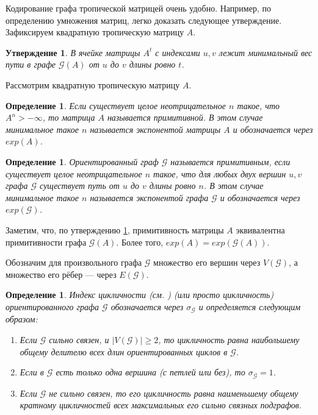 \documentclass[12pt]{article}
\newtheorem{definition}[theorem]{Определение}
\newtheorem{proposition}[theorem]{Утверждение}
\begin{document}
Кодирование графа тропической матрицей очень удобно. Например, по определению умножения матриц, легко доказать следующее утверждение. Зафиксируем квадратную тропическую матрицу $A$.

\begin{proposition}
\label{entriesInPower}
В ячейке матрицы $A^t$ с индексами $u, v$ лежит минимальный вес пути в графе $\mathcal{G}(A)$ от $u$ до $v$ длины ровно $t$.
\end{proposition}

Рассмотрим квадратную тропическую матрицу $A$.

\begin{definition}
Если существует целое неотрицательное $n$ такое, что $A^n > -\infty$, то матрица $A$ называется примитивной. В этом случае минимальное такое $n$ называется экспонентой матрицы $A$ и обозначается через $exp(A)$.
\end{definition}

\begin{definition}
Ориентированный граф $\mathcal{G}$ называется примитивным, если существует целое неотрицательное $n$ такое, что для любых двух вершин $u, v$ графа $\mathcal{G}$ существует путь от $u$ до $v$ длины ровно $n$. В этом случае минимальное такое $n$ называется экспонентой графа $\mathcal{G}$ и обозначается через $exp(\mathcal{G})$.
\end{definition}

Заметим, что, по утверждению \ref{entriesInPower}, примитивность матрицы $A$ эквивалентна примитивности графа $\mathcal{G}(A)$. Более того, $exp(A) = exp(\mathcal{G}(A))$.

Обозначим для произвольного графа $\mathcal{G}$ множество его вершин через $V(\mathcal{G})$, а множество его рёбер --- через $E(\mathcal{G})$.

\begin{definition}
Индекс цикличности (см. \cite{cyclicity}) (или просто цикличность) ориентированного графа $\mathcal{G}$ обозначается через $\sigma_\mathcal{G}$ и определяется следующим образом:
\begin{enumerate}
    \item Если $\mathcal{G}$ сильно связен, и $|V(\mathcal{G})| \ge 2$, то цикличность равна наибольшему общему делителю всех длин ориентированных циклов в $\mathcal{G}$.
    \item Если в $\mathcal{G}$ есть только одна вершина (с петлей или без), то $\sigma_\mathcal{G} = 1$.
    \item Если $\mathcal{G}$ не сильно связен, то его цикличность равна наименьшему общему кратному цикличностей всех максимальных его сильно связных подграфов.
\end{enumerate}
\end{definition}
\end{document}
